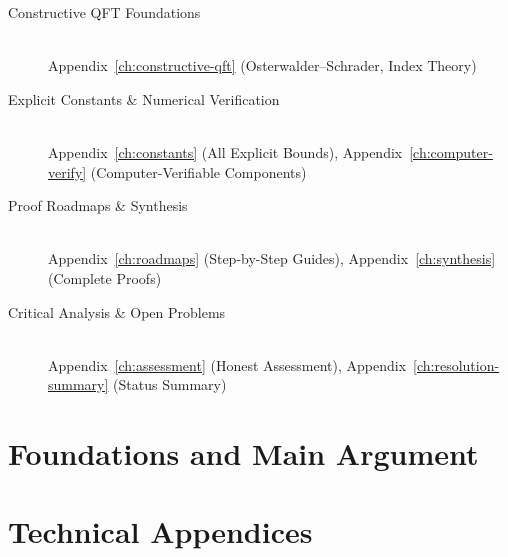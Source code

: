 \documentclass[11pt,a4paper]{report}
\begin{document}
\begin{description}
\item[Constructive QFT Foundations] \hfill \\
  Appendix~\ref{ch:constructive-qft} (Osterwalder--Schrader, Index Theory)

\item[Explicit Constants \& Numerical Verification] \hfill \\
  Appendix~\ref{ch:constants} (All Explicit Bounds),
  Appendix~\ref{ch:computer-verify} (Computer-Verifiable Components)

\item[Proof Roadmaps \& Synthesis] \hfill \\
  Appendix~\ref{ch:roadmaps} (Step-by-Step Guides),
  Appendix~\ref{ch:synthesis} (Complete Proofs)

\item[Critical Analysis \& Open Problems] \hfill \\
  Appendix~\ref{ch:assessment} (Honest Assessment),
  Appendix~\ref{ch:resolution-summary} (Status Summary)
\end{description}

\newpage

\part{Foundations and Main Argument}









\part{Technical Appendices}
\appendix
\renewcommand{\thechapter}{\AlphAlph{\value{chapter}}}
\end{document}
